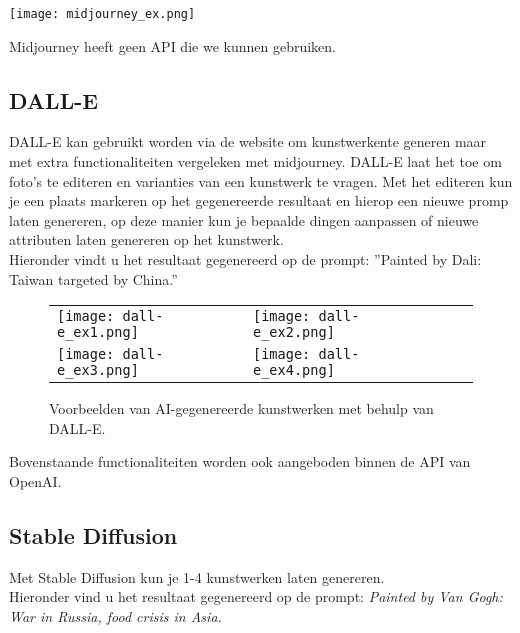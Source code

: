 \begin{center}
    \texttt{[image: midjourney\_ex.png]}
    \label{fig:midjourney_ex.png}
\end{center}

Midjourney heeft geen API die we kunnen gebruiken.

\subsection{ DALL-E}
DALL-E kan gebruikt worden via de website om kunstwerkente generen maar met extra functionaliteiten vergeleken met midjourney. DALL-E laat het toe om foto's te editeren en varianties van een kunstwerk te vragen. Met het editeren kun je een plaats markeren op het gegenereerde resultaat en hierop een nieuwe promp laten genereren, op deze manier kun je bepaalde dingen aanpassen of nieuwe attributen laten genereren op het kunstwerk. \\

Hieronder vindt u het resultaat gegenereerd op de prompt: ''Painted by Dali: Taiwan targeted by China.'' \\

\begin{figure}[h!]
    \centering
    \begin{tabular}{llll}
        \texttt{[image: dall-e\_ex1.png]} &
        \texttt{[image: dall-e\_ex2.png]} \\
        \texttt{[image: dall-e\_ex3.png]} &
        \texttt{[image: dall-e\_ex4.png]}
    \end{tabular}
    \caption{Voorbeelden van AI-gegenereerde kunstwerken met behulp van DALL-E.}
    \label{fig:examples}
\end{figure}


 Bovenstaande functionaliteiten worden ook aangeboden binnen de API van OpenAI.
\pagebreak

\subsection{Stable Diffusion}
Met Stable Diffusion kun je 1-4 kunstwerken laten genereren. \\

Hieronder vind u het resultaat gegenereerd op de prompt:  \emph{Painted by Van Gogh: War in Russia, food crisis in Asia.}

